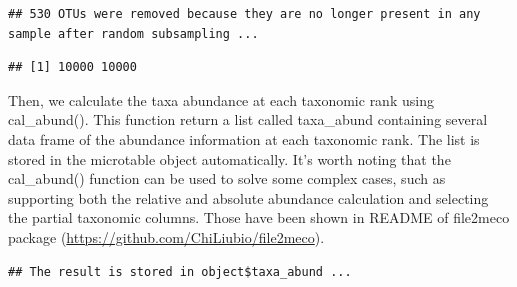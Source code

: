 \documentclass[
]{book}
\newenvironment{Shaded}{\begin{snugshade}}{\end{snugshade}}
\newcommand{\AttributeTok}[1]{\textcolor[rgb]{0.77,0.63,0.00}{#1}}
\newcommand{\CommentTok}[1]{\textcolor[rgb]{0.56,0.35,0.01}{\textit{#1}}}
\newcommand{\DecValTok}[1]{\textcolor[rgb]{0.00,0.00,0.81}{#1}}
\newcommand{\FunctionTok}[1]{\textcolor[rgb]{0.00,0.00,0.00}{#1}}
\newcommand{\NormalTok}[1]{#1}
\newcommand{\SpecialCharTok}[1]{\textcolor[rgb]{0.00,0.00,0.00}{#1}}
\begin{document}
\begin{Shaded}
\end{Shaded}

\begin{verbatim}
## 530 OTUs were removed because they are no longer present in any sample after random subsampling ...
\end{verbatim}

\begin{Shaded}
\end{Shaded}

\begin{verbatim}
## [1] 10000 10000
\end{verbatim}

Then, we calculate the taxa abundance at each taxonomic rank using cal\_abund().
This function return a list called taxa\_abund containing several data frame of the abundance information at each taxonomic rank.
The list is stored in the microtable object automatically.
It's worth noting that the cal\_abund() function can be used to solve some complex cases,
such as supporting both the relative and absolute abundance calculation and selecting the partial taxonomic columns.
Those have been shown in README of file2meco package (\url{https://github.com/ChiLiubio/file2meco}).

\begin{Shaded}
\end{Shaded}

\begin{verbatim}
## The result is stored in object$taxa_abund ...
\end{verbatim}

\begin{Shaded}
\end{Shaded}
\end{document}
